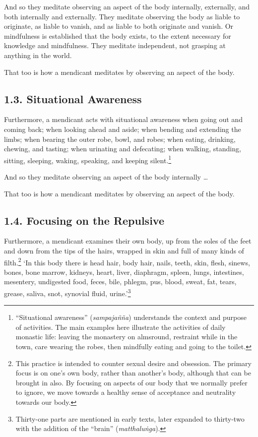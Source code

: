 \documentclass[12pt,openany]{book}%
\begin{document}
And so they meditate observing an aspect of the body internally, externally, and both internally and externally. They meditate observing the body as liable to originate, as liable to vanish, and as liable to both originate and vanish. Or mindfulness is established that the body exists, to the extent necessary for knowledge and mindfulness. They meditate independent, not grasping at anything in the world. 

That too is how a mendicant meditates by observing an aspect of the body. 

\subsection*{1.3. Situational Awareness }

Furthermore, a mendicant acts with situational awareness when going out and coming back; when looking ahead and aside; when bending and extending the limbs; when bearing the outer robe, bowl, and robes; when eating, drinking, chewing, and tasting; when urinating and defecating; when walking, standing, sitting, sleeping, waking, speaking, and keeping silent.\footnote{“Situational awareness” (\textit{\textsanskrit{sampajañña}}) understands the context and purpose of activities. The main examples here illustrate the activities of daily monastic life: leaving the monastery on almsround, restraint while in the town, care wearing the robes, then mindfully eating and going to the toilet. } 

And so they meditate observing an aspect of the body internally … 

That too is how a mendicant meditates by observing an aspect of the body. 

\subsection*{1.4. Focusing on the Repulsive }

Furthermore, a mendicant examines their own body, up from the soles of the feet and down from the tips of the hairs, wrapped in skin and full of many kinds of filth.\footnote{This practice is intended to counter sexual desire and obsession. The primary focus is on one’s own body, rather than another’s body, although that can be brought in also. By focusing on aspects of our body that we normally prefer to ignore, we move towards a healthy sense of acceptance and neutrality towards our body. } ‘In this body there is head hair, body hair, nails, teeth, skin, flesh, sinews, bones, bone marrow, kidneys, heart, liver, diaphragm, spleen, lungs, intestines, mesentery, undigested food, feces, bile, phlegm, pus, blood, sweat, fat, tears, grease, saliva, snot, synovial fluid, urine.’\footnote{Thirty-one parts are mentioned in early texts, later expanded to thirty-two with the addition of the “brain” (\textit{\textsanskrit{matthaluṅga}}). } 
\end{document}
